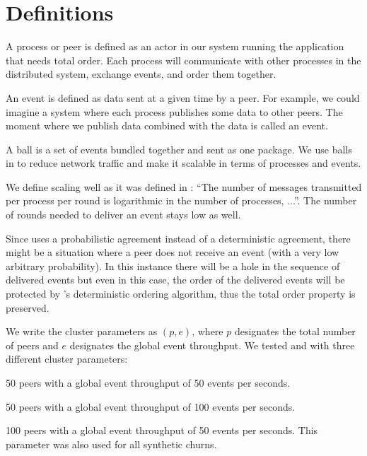 \section{Definitions}
A process or peer is defined as an actor in our system running the application that needs total order. Each process will communicate with other processes in the distributed system, exchange events, and order them together.
\par
An event is defined as data sent at a given time by a peer. For example, we could imagine a system where each process publishes some data to other peers. The moment where we publish data combined with the data is called an event.
\par
A ball is a set of events bundled together and sent as one package. We use balls in \epto to reduce network traffic and make it scalable in terms of processes and events.

We define \epto scaling well as it was defined in  \autocite{matos2015epto}:  ``The number
of messages transmitted per process per round is logarithmic
in the number of processes, ...''. The number of rounds needed to deliver an event stays low as well.
\par
Since \epto uses a probabilistic agreement instead of a deterministic agreement, there might be a situation where a peer does not receive an event (with a very low arbitrary probability). In this instance there will be a hole in the sequence of delivered events but even in this case, the order of the delivered events will be protected by \epto's deterministic ordering algorithm, thus the total order property is preserved.
\par
We write the cluster parameters as $(p,e)$, where $p$ designates the total number of peers and $e$ designates the global event throughput. We tested \epto and \jgroups with three different cluster parameters:
\begin{description}[\IEEEsetlabelwidth{$(100,100)$:}]
	\item[\textbf{$(100,100)$}:] 50 peers with a global event throughput of 50 events per seconds.
	\item[\textbf{$(100,100)$}:] 50 peers with a global event throughput of 100 events per seconds.
	\item[\textbf{$(100,100)$}:] 100 peers with a global event throughput of 50 events per seconds. This parameter was also used for all synthetic churns.
\end{description}
\par
